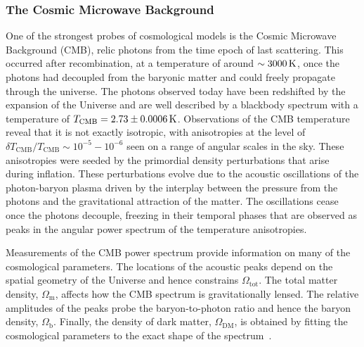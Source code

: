 \subsubsection*{The Cosmic Microwave Background}
One of the strongest probes of cosmological models is the Cosmic Microwave Background (CMB), relic photons from the time epoch of last scattering. This occurred after recombination, at a temperature of around $\sim 3000 {\rm \,K}$, once the photons had decoupled from the baryonic matter and could freely propagate through the universe. The photons observed today have been redshifted by the expansion of the Universe and are well described by a blackbody spectrum with a temperature of $T_\mathrm{CMB} = 2.73\pm 0.0006{\rm \,K}$. Observations of the CMB temperature reveal that it is not exactly isotropic, with anisotropies at the level of $\delta T_\mathrm{CMB}/T_\mathrm{CMB}\sim 10^{-5} - 10^{-6} $ seen on a range of angular scales in the sky. These anisotropies were seeded by the primordial density perturbations that arise during inflation. These perturbations evolve due to the acoustic oscillations of the photon-baryon plasma driven by the interplay between the pressure from the photons and the gravitational attraction of the matter. The oscillations cease once the photons decouple, freezing in their temporal phases that are observed as peaks in the angular power spectrum of the temperature anisotropies. 

Measurements of the CMB power spectrum provide information on many of the cosmological parameters. The locations of the acoustic peaks depend on the spatial geometry of the Universe and hence constrains $\Omega_\mathrm{tot}$. The total matter density, $\Omega_\mathrm{m}$, affects how the CMB spectrum is gravitationally lensed.  The relative amplitudes of the peaks probe the baryon-to-photon ratio and hence the baryon density, $\Omega_\mathrm{b}$. Finally, the density of dark matter, $\Omega_\mathrm{DM}$, is obtained by fitting the cosmological parameters to the exact shape of the spectrum~\cite{Freese:2008cz_may_ReviewObservationalEvidence, Planck:2018vyg_sep_Planck2018results}. 

